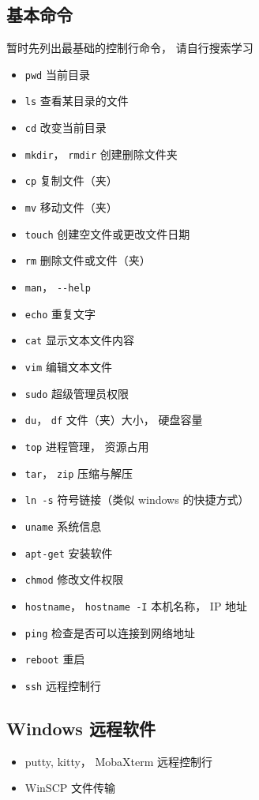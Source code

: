\subsection{基本命令}
暂时先列出最基础的控制行命令， 请自行搜索学习
\begin{itemize}
\item \lstinline|pwd| 当前目录
\item \lstinline|ls| 查看某目录的文件
\item \lstinline|cd| 改变当前目录
\item \lstinline|mkdir|， \lstinline|rmdir| 创建删除文件夹
\item \lstinline|cp| 复制文件（夹）
\item \lstinline|mv| 移动文件（夹）
\item \lstinline|touch| 创建空文件或更改文件日期
\item \lstinline|rm| 删除文件或文件（夹）
\item \lstinline|man|， \lstinline|--help|
\item \lstinline|echo| 重复文字
\item \lstinline|cat| 显示文本文件内容
\item \lstinline|vim| 编辑文本文件
\item \lstinline|sudo| 超级管理员权限
\item \lstinline|du|， \lstinline|df| 文件（夹）大小， 硬盘容量
\item \lstinline|top| 进程管理， 资源占用
\item \lstinline|tar|， \lstinline|zip| 压缩与解压
\item \lstinline|ln -s| 符号链接（类似 windows 的快捷方式）
\item \lstinline|uname| 系统信息
\item \lstinline|apt-get| 安装软件
\item \lstinline|chmod| 修改文件权限
\item \lstinline|hostname|， \lstinline|hostname -I| 本机名称， IP 地址
\item \lstinline|ping| 检查是否可以连接到网络地址
\item \lstinline|reboot| 重启
\item \lstinline|ssh| 远程控制行
\end{itemize}

\subsection{Windows 远程软件}
\begin{itemize}
\item putty, kitty， MobaXterm 远程控制行
\item WinSCP 文件传输
\end{itemize}
